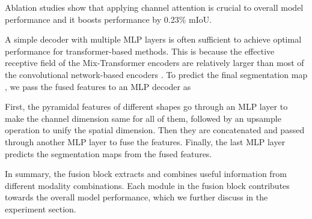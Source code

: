 \documentclass{article}
\begin{document}
Ablation studies show that applying channel attention is crucial to overall model performance and it boosts performance by 0.23\% mIoU. 


A simple decoder with multiple MLP layers is often sufficient to achieve optimal performance for transformer-based methods. This is because the effective receptive field of the Mix-Transformer encoders are relatively larger than most of the convolutional network-based encoders \cite{xie2021segformer}. To predict the final segmentation map , we pass the fused features  to an MLP decoder as 

First, the pyramidal features of different shapes go through an MLP layer to make the channel dimension same for all of them, followed by an upsample operation to unify the spatial dimension. Then they are concatenated and passed through another MLP layer to fuse the features. Finally, the last MLP layer predicts the segmentation maps from the fused features. 

In summary, the fusion block extracts and combines useful information from different modality combinations. Each module in the fusion block contributes towards the overall model performance, which we further discuss in the experiment section. 
\end{document}
